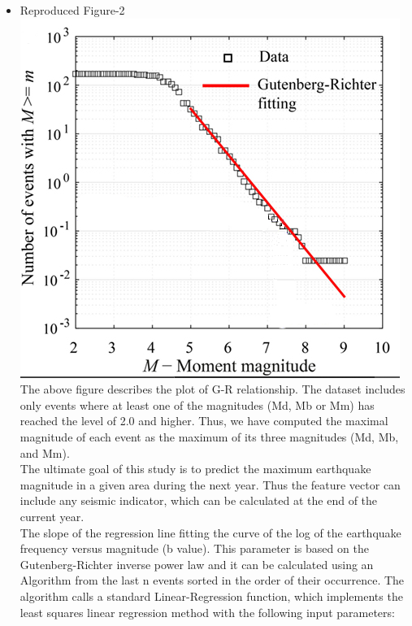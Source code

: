 \documentclass{article}
\begin{document}
\begin{itemize}
\newpage
\item Reproduced Figure-2\\
\includegraphics[scale =0.6]{gr fitting.PNG}\\
The above figure describes the plot of G-R relationship. The dataset includes only events where at least one of the magnitudes (Md, Mb or Mm) has reached the level of 2.0 and higher. Thus, we have computed the maximal magnitude of each event as the maximum of its three magnitudes (Md, Mb, and Mm).\\
The ultimate goal of this study is to predict the maximum earthquake magnitude in a given area during the next year. Thus the feature vector can include any seismic indicator, which can be calculated at the end of the current year.\\
The slope of the regression line fitting the curve of the log of the earthquake frequency versus magnitude (b value). This parameter is based on the Gutenberg-Richter inverse power law and it can be calculated using an Algorithm\cite{cite14}  from the last n events sorted in the order of their occurrence. The algorithm calls a standard Linear-Regression function, which implements the least squares linear regression method with the following input parameters:


\end{itemize}
\end{document}
